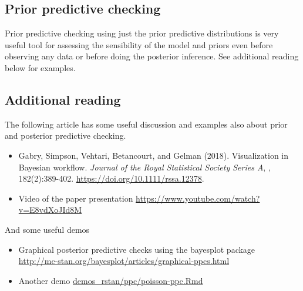 \documentclass[a4paper,11pt,english]{article}
\begin{document}
 \subsection*{Prior predictive checking}

 Prior predictive checking using just the prior predictive
 distributions is very useful tool for assessing the sensibility of
 the model and priors even before observing any data or before doing
 the posterior inference. See additional reading below for examples.
 
 \subsection*{Additional reading}

The following article has some useful discussion and examples also about prior and posterior predictive checking.
\begin{itemize}
\item  Gabry, Simpson, Vehtari, Betancourt, and Gelman (2018). Visualization in Bayesian workflow. {\em Journal of the Royal Statistical Society Series A}, , 182(2):389-402. \url{https://doi.org/10.1111/rssa.12378}.
\item Video of the paper presentation \url{https://www.youtube.com/watch?v=E8vdXoJId8M}
\end{itemize}

And some useful demos
\begin{itemize}
  \item Graphical posterior predictive checks using the bayesplot package\\
    \url{http://mc-stan.org/bayesplot/articles/graphical-ppcs.html}
  \item Another demo \href{http://avehtari.github.io/BDA_R_demos/demos_rstan/ppc/poisson-ppc.html}{demos\_rstan/ppc/poisson-ppc.Rmd}
  \end{itemize}
\end{document}
